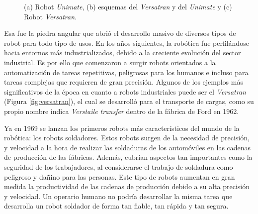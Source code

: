 \begin{figure}[htbp!]
	\begin{center}
		\hspace{0.1cm}
		\hspace{0.1cm}
	\end{center}	
	\centering
	\captionsetup{justification=centering,margin=2.5cm}
	\caption{(a) Robot \textit{Unimate}, (b) esquemas del \textit{Versatran} y del \textit{Unimate} y (c) Robot \textit{Versatran}.}
	\label{fig:robots1}
\end{figure}

Esa fue la piedra angular que abrió el desarrollo masivo de diversos tipos de robot para todo tipo de usos. En los años siguientes, la robótica fue perfilándose hacia entornos más industrializados, debido a la creciente evolución del sector industrial. Es por ello que comenzaron a surgir robots orientados a la automatización de tareas repetitivas, peligrosas para los humanos e incluso para tareas complejas que requieren de gran precisión. Algunos de los ejemplos más significativos de la época en cuanto a robots industriales puede ser el \textit{Versatran} (Figura \ref{fig:versatran}), el cual se desarrolló para el transporte de cargas, como su propio nombre indica \textit{Verstaile transfer} dentro de la fábrica de Ford en 1962.

Ya en 1969 se lanzan los primeros robots más característicos del mundo de la robótica: los robots soldadores. Estos robots surgen de la necesidad de precisión, y velocidad a la hora de realizar las soldaduras de los automóviles en las cadenas de producción de las fábricas. Además, cubrían aspectos tan importantes como la seguridad de los trabajadores, al considerarse el trabajo de soldadura como peligroso y dañino para las personas. Este tipo de robots aumentan en gran medida la productividad de las cadenas de producción debido a su alta precisión y velocidad. Un operario humano no podría desarrollar la misma tarea que desarrolla un robot soldador de forma tan fiable, tan rápida y tan segura.

